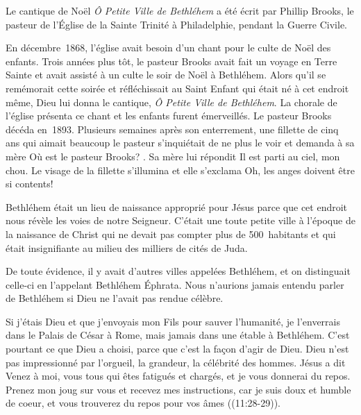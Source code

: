 

Le cantique de Noël \emph{Ô Petite Ville de Bethléhem} a été écrit par Phillip Brooks, le pasteur de l'Église de la Sainte Trinité à Philadelphie, pendant la Guerre Civile.

En décembre~1868, l'église avait besoin d'un chant pour le culte de Noël des enfants. Trois années plus tôt, le pasteur Brooks avait fait un voyage en Terre Sainte et avait assisté à un culte le soir de Noël à Bethléhem. Alors qu'il se remémorait cette soirée et réfléchissait au Saint Enfant qui était né à cet endroit même, Dieu lui donna le cantique, \emph{Ô Petite Ville de Bethléhem}. La chorale de l'église présenta ce chant et les enfants furent émerveillés. Le pasteur Brooks décéda en~1893. Plusieurs semaines après son enterrement, une fillette de cinq ans qui aimait beaucoup le pasteur s'inquiétait de ne plus le voir et demanda à sa mère\frcolon{} \Og Où est le pasteur Brooks? \Fg{}. Sa mère lui répondit\frcolon{} \Og Il est parti au ciel, mon chou. \Fg{} Le visage de la fillette s'illumina et elle s'exclama\frcolon{} \Og Oh, les anges doivent être si contents! \Fg{}

Bethléhem était un lieu de naissance approprié pour Jésus parce que cet endroit nous révèle les voies de notre Seigneur. C'était une toute petite ville à l'époque de la naissance de Christ qui ne devait pas compter plus de 500~habitants et qui était insignifiante au milieu des milliers de cités de Juda.

De toute évidence, il y avait d'autres villes appelées Bethléhem, et on distinguait celle-ci en l'appelant Bethléhem Éphrata. Nous n'aurions jamais entendu parler de Bethléhem si Dieu ne l'avait pas rendue célèbre.

Si j'étais Dieu et que j'envoyais mon Fils pour sauver l'humanité, je l'enverrais dans le Palais de César à Rome, mais jamais dans une étable à Bethléhem. C'est pourtant ce que Dieu a choisi, parce que c'est la façon d'agir de Dieu. Dieu n'est pas impressionné par l'orgueil, la grandeur, la célébrité des hommes. Jésus a dit\frcolon{}
\Og Venez à moi, vous tous qui êtes fatigués et chargés, et je vous donnerai du repos. Prenez mon joug sur vous et recevez mes instructions, car je suis doux et humble de coeur, et vous trouverez du repos pour vos âmes \Fg{} ((11:28-29)).

